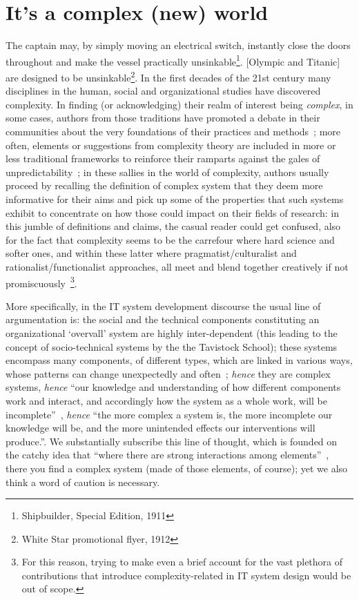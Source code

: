 \documentclass{article}
\let\origquotation\quotation
\let\endorigquotation\endquotation
\renewenvironment{quotation}{\vspace{-0.5\parskip}
  \origquotation
  \footnotesize
}{\endorigquotation}
\begin{document}
\section{It's a complex (new) world}
\begin{quotation}
The captain may, by simply moving an electrical switch, instantly close the doors throughout and make the vessel practically unsinkable\footnote{Shipbuilder, Special Edition, 1911}. [Olympic and Titanic] are designed to be unsinkable\footnote{White Star promotional flyer, 1912}.
\end{quotation}
\label{sec:complexity}
In the first decades of the 21st century many disciplines in the human, social and organizational studies have discovered complexity. In finding (or acknowledging) their realm of interest being \emph{complex}, in some cases, authors from those traditions have promoted a debate in their communities about the very foundations of their practices and methods~\citep[see e.g.,~][]{greenhalgh_response_2010}; more often, elements or suggestions from complexity theory are included in more or less traditional frameworks to reinforce their ramparts against the gales of unpredictability~\citep[e.g.,~][]{norman_engineering_2004,pavard_contribution_2006}; in these sallies in the world of complexity, authors usually proceed by recalling the definition of complex system that they deem more informative for their aims and pick up some of the properties that such systems exhibit to concentrate on how those could impact on their fields of research: in this jumble of definitions and claims, the casual reader could get confused, also for the fact that complexity seems to be the carrefour where hard science and softer ones, and within these latter where pragmatist/culturalist and rationalist/functionalist approaches, all meet and blend together creatively if not promiscuously~\citep{kaghan_out_2001,kim_interpreting_2006}\footnote{For this reason, trying to make even a brief account for the vast plethora of contributions that introduce complexity-related in IT system design would be out of scope.}. 

More specifically, in the IT system development discourse the usual line of argumentation is: the social and the technical components constituting an organizational `overvall' system are highly inter-dependent (this leading to the concept of socio-technical systems by the the Tavistock School); these systems encompass many components, of different types, which are linked in various ways, whose patterns can change unexpectedly and often~\citep{schneberger_complexity_2003}; \emph{hence} they are complex systems, \emph{hence} ``our knowledge and understanding of how different components work and interact, and accordingly how the system as a whole work, will be incomplete''~\citep[p. 5]{hanseth_risk_2007}, \emph{hence} ``the more complex a system is, the more incomplete our knowledge will be, and the more unintended effects our interventions will produce.''. We substantially subscribe this line of thought, which is founded on the catchy idea that ``where there are strong interactions among elements''~\citep{axelrod_harnessing_1999}, there you find a complex system (made of those elements, of course); yet we also think a word of caution is necessary. 
\end{document}
